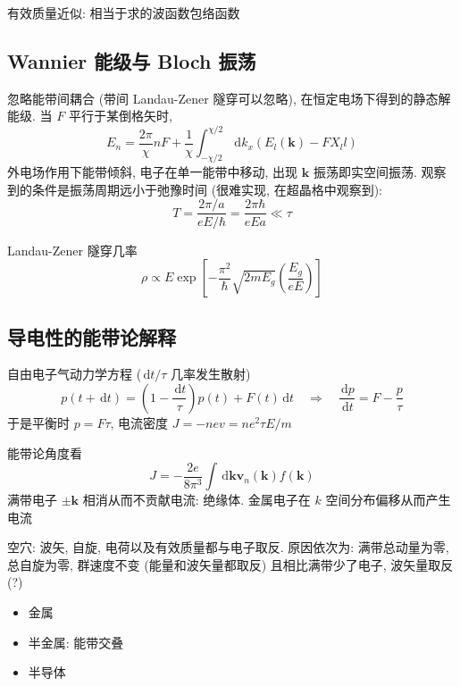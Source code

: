 \documentclass[11pt,a4paper]{article}%
\numberwithin{equation}{section}%
\renewcommand*{\vec}[1]{\bm{#1}}%
\newcommand{\dif}{\,\mathrm d}
\begin{document}
有效质量近似: 相当于求的波函数包络函数
\subsection{Wannier 能级与 Bloch 振荡} %
\label{sub:Wannier_bloch}
忽略能带间耦合 (带间 Landau-Zener 隧穿可以忽略), 在恒定电场下得到的静态解能级. 当 $F$ 平行于某倒格矢时, 
\begin{equation}
	E_n = \frac{2\pi}\chi nF +\frac 1\chi\int_{-\chi/2}^{\chi/2}\dif k_x \left(E_l(\vec k) - FX_ll\right)
\end{equation}
外电场作用下能带倾斜, 电子在单一能带中移动, 出现 $\vec k$ 振荡即实空间振荡. 观察到的条件是振荡周期远小于弛豫时间 (很难实现, 在超晶格中观察到): 
\begin{equation}
	T = \frac{2\pi/a}{eE/\hbar} = \frac{2\pi\hbar}{eEa} \ll \tau
\end{equation}

Landau-Zener 隧穿几率
\begin{equation}
	\rho\propto E\exp\left[-\frac{\pi^2}{\hbar}\sqrt{2mE_g}\left(\frac{E_g}{eE}\right)\right]
\end{equation}
\subsection{导电性的能带论解释} %
\label{sub:why_conductor}
自由电子气动力学方程 ($\dif t/\tau$ 几率发生散射)
\begin{equation}
	p(t+\dif t) = \left(1 - \frac{\dif t}{\tau}\right)p(t) + F(t)\dif t \quad\Rightarrow\quad
	\frac{\dif p}{\dif t} = F - \frac p\tau
\end{equation}
于是平衡时 $p = F\tau$, 电流密度 $J = -nev = ne^2\tau E/m$

能带论角度看
\begin{equation}
	J = -\frac{2e}{8\pi^3}\int\dif\vec k \vec v_n(\vec k)f(\vec k)
\end{equation}
满带电子 $\pm\vec k$ 相消从而不贡献电流: 绝缘体. 金属电子在 $k$ 空间分布偏移从而产生电流

空穴: 波矢, 自旋, 电荷以及有效质量都与电子取反. 原因依次为: 满带总动量为零, 总自旋为零, 群速度不变 (能量和波矢量都取反) 且相比满带少了电子, 波矢量取反(?)
\begin{itemize}
	\item 金属
	\item 半金属: 能带交叠
	\item 半导体
\end{itemize}
\end{document}
